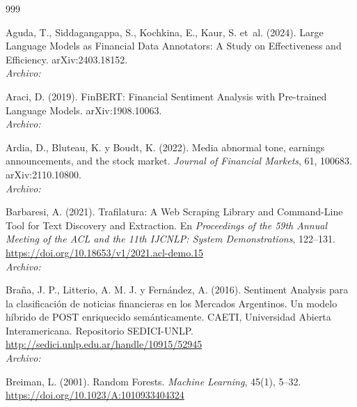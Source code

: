 \begin{thebibliography}{999}

Aguda, T., Siddagangappa, S., Kochkina, E., Kaur, S. et~al. (2024). Large Language Models as Financial Data Annotators: A Study on Effectiveness and Efficiency. arXiv:2403.18152.
\\\textit{Archivo:} 

Araci, D. (2019). {FinBERT}: Financial Sentiment Analysis with Pre-trained Language Models. arXiv:1908.10063.
\\\textit{Archivo:} 

Ardia, D., Bluteau, K. y Boudt, K. (2022). Media abnormal tone, earnings announcements, and the stock market. \emph{Journal of Financial Markets}, 61, 100683. arXiv:2110.10800.
\\\textit{Archivo:} 

Barbaresi, A. (2021). Trafilatura: A Web Scraping Library and Command-Line Tool for Text Discovery and Extraction. En \emph{Proceedings of the 59th Annual Meeting of the ACL and the 11th IJCNLP: System Demonstrations}, 122--131. \url{https://doi.org/10.18653/v1/2021.acl-demo.15}
\\\textit{Archivo:} 

Bra{\~n}a, J. P., Litterio, A. M. J. y Fern{\'a}ndez, A. (2016). Sentiment Analysis para la clasificaci{\'o}n de noticias financieras en los Mercados Argentinos. Un modelo h{\'i}brido de POST enriquecido sem{\'a}nticamente. CAETI, Universidad Abierta Interamericana. Repositorio SEDICI-UNLP. \url{http://sedici.unlp.edu.ar/handle/10915/52945}
\\\textit{Archivo:} 

Breiman, L. (2001). Random Forests. \textit{Machine Learning}, 45(1), 5--32. \url{https://doi.org/10.1023/A:1010933404324}


\end{thebibliography}
